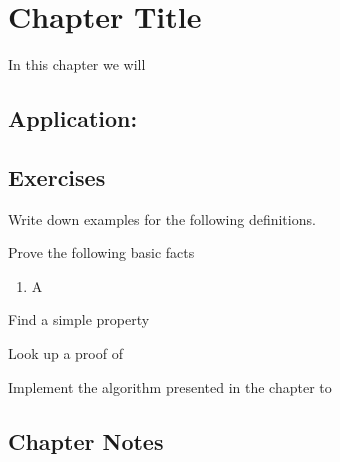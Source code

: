 \chapter{Chapter Title}\label{ch:chapter-title}
\begin{quote}


\end{quote}


In this chapter we will

\section{Application: }

\section{Exercises}

\vspace{\baselineskip}

\begin{ExerciseList}

\Exercise{} Write down examples for the following definitions.

\Exercise{} Prove the following basic facts

\begin{enumerate}
\item{} A
\end{enumerate}

\Exercise{} Find a simple property

\Exercise{} Look up a proof of

\Exercise{} Implement the algorithm presented in the chapter to

\end{ExerciseList}

\section{Chapter Notes}

